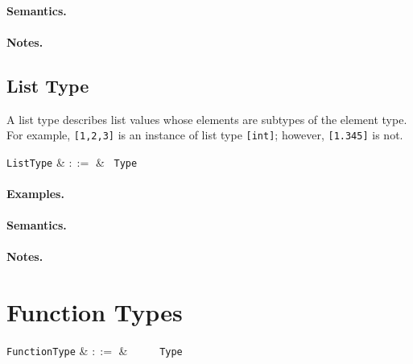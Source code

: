 \paragraph{Semantics.}

\paragraph{Notes.} 


\subsection{List Type}

A list type describes list values whose elements are subtypes of the element type. For example, \lstinline{[1,2,3]} is an instance of list type \lstinline{[int]}; however, \lstinline{[1.345]} is not.

\begin{syntax}
  \verb+ListType+ & $::=$ & \token{[} \ \verb+Type+ \ \token{]}\\
\end{syntax}

\paragraph{Examples.}

\paragraph{Semantics.}

\paragraph{Notes.} 


\section{Function Types}

\begin{syntax}
  \verb+FunctionType+ & $::=$ & \ \token{(}\
  \ \token{)}\ \token{=>}\ \verb+Type+\\
\end{syntax}

